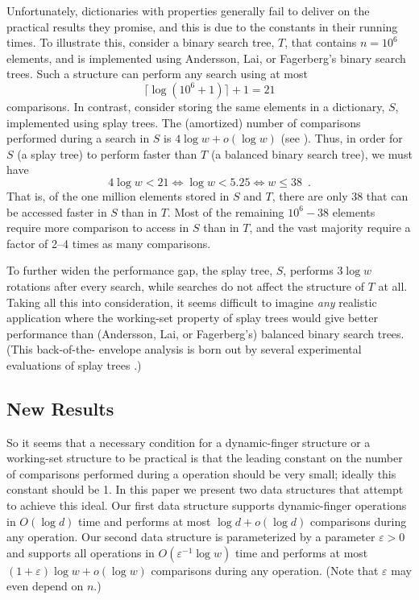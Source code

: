 \documentclass{patmorin}
\newcommand{\eps}{\varepsilon}
\begin{document}
Unfortunately, dictionaries with properties generally fail to deliver on
the practical results they promise, and this is due to the constants in
their running times.  To illustrate this, consider a binary search tree,
$T$, that contains $n=10^6$ elements, and is implemented using Andersson,
Lai, or Fagerberg's binary search trees.  Such a structure can perform
any search using at most
\[
   \lceil\log(10^6+1)\rceil+1= 21
\]
comparisons.  In contrast, consider storing the same elements in a
dictionary, $S$, implemented using splay trees.  The (amortized) number
of comparisons performed during a search in $S$ is $4\log w+o(\log w)$
(see ).  Thus, in order for $S$ (a splay tree)
to perform faster than $T$ (a balanced binary search tree), we must have
\[
   4\log w < 21 
       \Leftrightarrow \log w < 5.25 
       \Leftrightarrow w \le 38 \enspace .
\]
That is, of the one million elements stored in $S$ and $T$, there are only
38 that can be accessed faster in $S$ than in $T$.  Most of the remaining
$10^6 - 38$ elements require more comparison to access in $S$ than in $T$,
and the vast majority require a factor of 2--4 times as many comparisons.

To further widen the performance gap, the splay tree, $S$, performs
$3\log w$ rotations after every search, while searches do not affect
the structure of $T$ at all.  Taking all this into consideration,
it seems difficult to imagine \emph{any} realistic application where
the working-set property of splay trees would give better performance
than (Andersson, Lai, or Fagerberg's) balanced binary search trees.
(This back-of-the- envelope analysis is born out by several experimental
evaluations of splay trees \cite{X,X,X}.)

\subsection{New Results}

So it seems that a necessary condition for a dynamic-finger structure
or a working-set structure to be practical is that the leading constant
on the number of comparisons performed during a operation should be very
small; ideally this constant should be 1.  In this paper we present two
data structures that attempt to achieve this ideal.  Our first data
structure supports dynamic-finger operations in $O(\log d)$ time and
performs at most $\log d+o(\log d)$ comparisons during any operation. Our
second data structure is parameterized by a parameter $\eps >0$ and
supports all operations in $O(\eps^{-1}\log w)$ time and performs
at most $(1+\eps)\log w+o(\log w)$ comparisons during any operation.
(Note that $\eps$ may even depend on $n$.)
\end{document}

